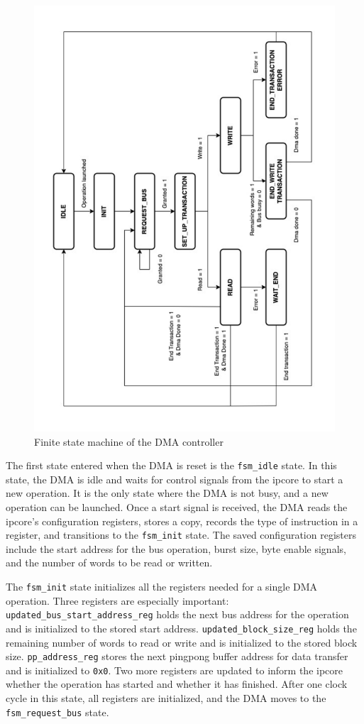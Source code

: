 \documentclass[a4paper,11pt,oneside]{report}
\begin{document}
\begin{figure}
    \centering
    \includegraphics[angle=-90, width=0.9\linewidth]{figures/dma_fsm.pdf}
    \caption{Finite state machine of the DMA controller}
    \label{fig:state_diagram}
\end{figure}

The first state entered when the DMA is reset is the \texttt{fsm\_idle} state.  
In this state, the DMA is idle and waits for control signals from the ipcore to start a new operation.  
It is the only state where the DMA is not busy, and a new operation can be launched.  
Once a start signal is received, the DMA reads the ipcore's configuration registers, stores a copy,  
records the type of instruction in a register, and transitions to the \texttt{fsm\_init} state.  
The saved configuration registers include the start address for the bus operation, burst size, byte enable signals, and the number of words to be read or written.

The \texttt{fsm\_init} state initializes all the registers needed for a single DMA operation.  
Three registers are especially important:  
\texttt{updated\_bus\_start\_address\_reg} holds the next bus address for the operation and is initialized to the stored start address.  
\texttt{updated\_block\_size\_reg} holds the remaining number of words to read or write and is initialized to the stored block size.  
\texttt{pp\_address\_reg} stores the next pingpong buffer address for data transfer and is initialized to \texttt{0x0}.  
Two more registers are updated to inform the ipcore whether the operation has started and whether it has finished.  
After one clock cycle in this state, all registers are initialized, and the DMA moves to the \texttt{fsm\_request\_bus} state.
\end{document}
